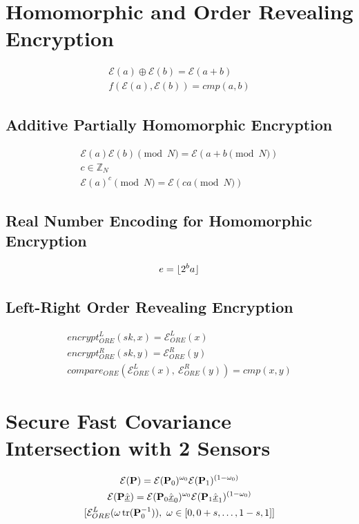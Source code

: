\documentclass[letterpaper, 10 pt, conference]{ieeeconf}  %
\begin{document}
\section{Homomorphic and Order Revealing Encryption}
\begin{gather}
   \mathcal{E}(a) \oplus \mathcal{E}(b) = \mathcal{E}(a+b) \\
   f(\mathcal{E}(a), \mathcal{E}(b)) = cmp(a, b)
\end{gather}
\subsection{Additive Partially Homomorphic Encryption}
\begin{gather}
   \mathcal{E}(a)\mathcal{E}(b) \pmod{N} = \mathcal{E}(a + b \pmod{N}) \\
   c \in \mathbb{Z}_N \\
   \mathcal{E}(a)^c \pmod{N} = \mathcal{E}(ca \pmod{N})
\end{gather}
\subsection{Real Number Encoding for Homomorphic Encryption}
\begin{gather}
   e = \lfloor{2^b a}\rfloor
\end{gather}
\subsection{Left-Right Order Revealing Encryption}
\begin{gather}
   encrypt^L_{ORE}(sk, x) = \mathcal{E}^L_{ORE}(x) \\
   encrypt^R_{ORE}(sk, y) = \mathcal{E}^R_{ORE}(y) \\
   compare_{ORE}(\mathcal{E}^L_{ORE}(x),\ \mathcal{E}^R_{ORE}(y)) = cmp(x, y)
\end{gather}

\section{Secure Fast Covariance Intersection with 2 Sensors}
\begin{gather}
   \mathcal{E}(\mP) = \mathcal{E}(\mP_0)^{\omega_0}\mathcal{E}(\mP_1)^{(1 -\omega_0)} \\
   \mathcal{E}(\mP\mean{\vec{x}}) = \mathcal{E}(\mP_0\mean{\vec{x}}_0)^{\omega_0}\mathcal{E}(\mP_1\mean{\vec{x}}_1)^{(1 - \omega_0)} \\
   [\mathcal{E}^L_{ORE}(\omega\tr(\mP^{-1}_0)),\ \omega \in [0,0+s,\dots,1-s,1]]
\end{gather}
\end{document}
